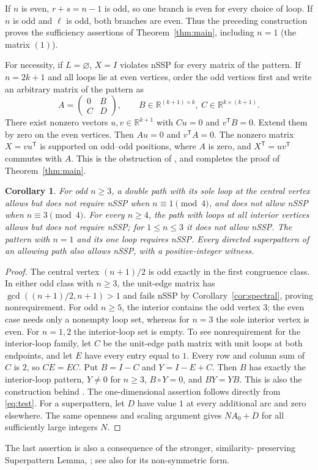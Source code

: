 \documentclass[11pt]{article}
\newtheorem{corollary}[theorem]{Corollary}
\newcommand{\R}{\mathbb R}
\begin{document}
If $n$ is even, $r+s=n-1$ is odd, so one branch is even for every
choice of loop. If $n$ is odd and $\ell$ is odd, both branches are even.
Thus the preceding construction proves the sufficiency assertions of
Theorem~\ref{thm:main}, including $n=1$ (the matrix $(1)$).

For necessity, if $L=\varnothing$, $X=I$ violates nSSP for every
matrix of the pattern. If $n=2k+1$ and all loops lie at even vertices,
order the odd vertices first and write an arbitrary matrix of the
pattern as
\[
 A=\begin{pmatrix}0&B\\ C&D\end{pmatrix},\qquad
 B\in\R^{(k+1)\times k},\ C\in\R^{k\times(k+1)}.
\]
There exist nonzero vectors $u,v\in\R^{k+1}$ with $Cu=0$ and
$v^{\mathsf T}B=0$. Extend them by zero on the even vertices.
Then $Au=0$ and $v^{\mathsf T}A=0$. The nonzero matrix
$X=vu^{\mathsf T}$ is supported on odd--odd positions, where $A$ is
zero, and $X^{\mathsf T}=uv^{\mathsf T}$ commutes with $A$.
This is the obstruction of \cite[Theorem 5.7(Cc)]{KO}, and completes
the proof of Theorem~\ref{thm:main}.

\begin{corollary}\label{cor:siblings}
For odd $n\geq3$, a double path with its sole loop at the central
vertex allows but does not require nSSP when $n\equiv1\pmod4$,
and does not allow nSSP when $n\equiv3\pmod4$.
For every $n\geq4$, the path with loops at all interior vertices
allows but does not require nSSP; for $1\leq n\leq3$ it does not allow nSSP.
The pattern with $n=1$ and its one loop requires nSSP.
Every directed superpattern of an allowing path also allows nSSP,
with a positive-integer witness.
\end{corollary}
\begin{proof}
The central vertex $(n+1)/2$ is odd exactly in the first congruence
class. In either odd class with $n\geq3$, the unit-edge matrix has
$\gcd((n+1)/2,n+1)>1$ and fails nSSP by
Corollary~\ref{cor:spectral}, proving nonrequirement.
For odd $n\geq5$, the interior contains the odd vertex $3$;
the even case needs only a nonempty loop set, whereas for $n=3$
the sole interior vertex is even. For $n=1,2$ the interior-loop set
is empty. To see nonrequirement for the
interior-loop family, let $C$ be the unit-edge path matrix with
unit loops at both endpoints, and let $E$ have every entry equal to $1$.
Every row and column sum of $C$ is $2$, so $CE=EC$.
Put $B=I-C$ and $Y=I-E+C$. Then $B$ has exactly the interior-loop
pattern, $Y\ne0$ for $n\geq3$, $B\circ Y=0$, and $BY=YB$.
This is also the construction behind \cite[Theorem 5.7(A)]{KO}.
The one-dimensional assertion follows directly from \eqref{eq:test}.
For a superpattern, let $D$ have value $1$ at every additional arc
and zero elsewhere. The same openness and scaling argument gives
$NA_0+D$ for all sufficiently large integers $N$.
\end{proof}
The last assertion is also a consequence of the stronger, similarity-
preserving Superpattern Lemma, \cite[Lemma 1.2]{KO}; see also
\cite[Theorem 5.4]{F} for its non-symmetric form.
\end{document}
